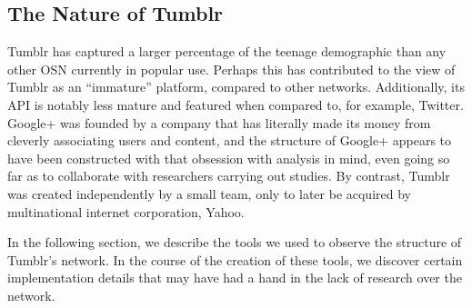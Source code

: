 \subsection{The Nature of Tumblr}
Tumblr has captured a larger percentage of the teenage 
demographic\cite{glenn2013more} than any other OSN currently in popular use.  
Perhaps this has contributed to the view of Tumblr as an ``immature'' 
platform, compared to other networks.  Additionally, its API is 
notably less mature and featured when compared to, for example, 
Twitter.  Google+ was founded by a company that has literally made 
its money from cleverly associating users and content, and the 
structure of Google+ appears to have been constructed with that 
obsession with analysis in mind, even going so far as to collaborate 
with researchers carrying out studies\cite{kairam2012talking}.  By 
contrast, Tumblr was created independently by a small team, only to 
later be acquired by multinational internet corporation, Yahoo.

In the following section, we describe the tools we used to observe the 
structure of Tumblr's network.  In the course of the creation of these 
tools, we discover certain implementation details that may have had 
a hand in the lack of research over the network. 


